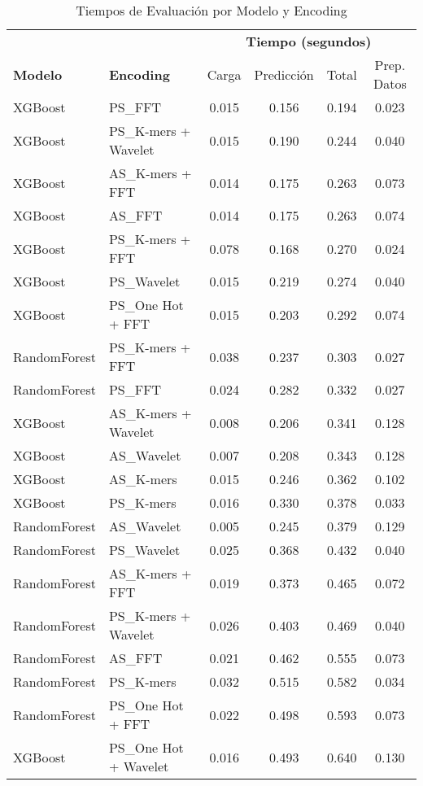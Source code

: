 \begin{table*}[htbp]
\centering
\caption{Tiempos de Evaluación por Modelo y Encoding}
\label{tab:evaluation_times}
\scriptsize
\renewcommand{\arraystretch}{1.0}
\begin{tabular}{llcccc}
\toprule
& & \multicolumn{4}{c}{\textbf{Tiempo (segundos)}} \\
\cmidrule(lr){3-6}
\textbf{Modelo} & \textbf{Encoding} & Carga & Predicción & Total & Prep. Datos \\
\midrule
XGBoost & PS\_FFT & 0.015 & 0.156 & 0.194 & 0.023 \\
XGBoost & PS\_K-mers + Wavelet & 0.015 & 0.190 & 0.244 & 0.040 \\
XGBoost & AS\_K-mers + FFT & 0.014 & 0.175 & 0.263 & 0.073 \\
XGBoost & AS\_FFT & 0.014 & 0.175 & 0.263 & 0.074 \\
XGBoost & PS\_K-mers + FFT & 0.078 & 0.168 & 0.270 & 0.024 \\
XGBoost & PS\_Wavelet & 0.015 & 0.219 & 0.274 & 0.040 \\
XGBoost & PS\_One Hot + FFT & 0.015 & 0.203 & 0.292 & 0.074 \\
RandomForest & PS\_K-mers + FFT & 0.038 & 0.237 & 0.303 & 0.027 \\
RandomForest & PS\_FFT & 0.024 & 0.282 & 0.332 & 0.027 \\
XGBoost & AS\_K-mers + Wavelet & 0.008 & 0.206 & 0.341 & 0.128 \\
XGBoost & AS\_Wavelet & 0.007 & 0.208 & 0.343 & 0.128 \\
XGBoost & AS\_K-mers & 0.015 & 0.246 & 0.362 & 0.102 \\
XGBoost & PS\_K-mers & 0.016 & 0.330 & 0.378 & 0.033 \\
RandomForest & AS\_Wavelet & 0.005 & 0.245 & 0.379 & 0.129 \\
RandomForest & PS\_Wavelet & 0.025 & 0.368 & 0.432 & 0.040 \\
RandomForest & AS\_K-mers + FFT & 0.019 & 0.373 & 0.465 & 0.072 \\
RandomForest & PS\_K-mers + Wavelet & 0.026 & 0.403 & 0.469 & 0.040 \\
RandomForest & AS\_FFT & 0.021 & 0.462 & 0.555 & 0.073 \\
RandomForest & PS\_K-mers & 0.032 & 0.515 & 0.582 & 0.034 \\
RandomForest & PS\_One Hot + FFT & 0.022 & 0.498 & 0.593 & 0.073 \\
XGBoost & PS\_One Hot + Wavelet & 0.016 & 0.493 & 0.640 & 0.130 \\

\end{tabular}
\end{table*}
